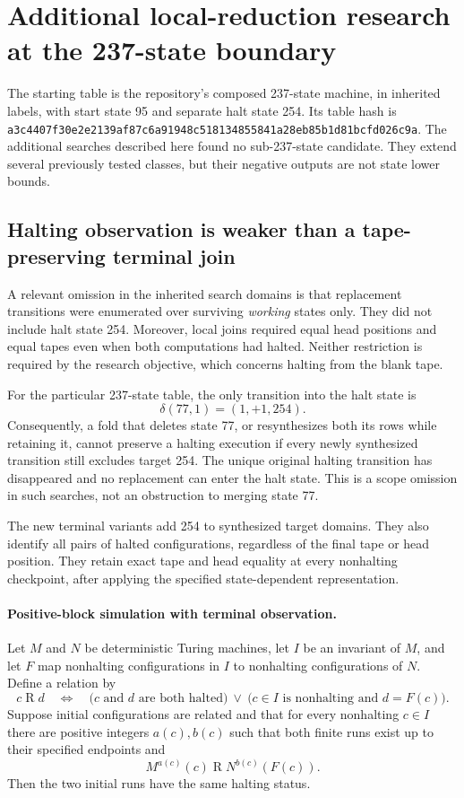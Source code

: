 \section{Additional local-reduction research at the 237-state boundary}

The starting table is the repository's composed 237-state machine, in inherited
labels, with start state 95 and separate halt state 254. Its table hash is
\texttt{a3c4407f30e2e2139af87c6a91948c518134855841a28eb85b1d81bcfd026c9a}.
The additional searches described here found no sub-237-state candidate.
They extend several previously tested classes, but their negative outputs are
not state lower bounds.

\subsection{Halting observation is weaker than a tape-preserving terminal join}

A relevant omission in the inherited search domains is that replacement
transitions were enumerated over surviving \emph{working} states only. They did
not include halt state 254. Moreover, local joins required equal head positions
and equal tapes even when both computations had halted. Neither restriction is
required by the research objective, which concerns halting from the blank tape.

For the particular 237-state table, the only transition into the halt state is
\[
 \delta(77,1)=(1,+1,254).
\]
Consequently, a fold that deletes state 77, or resynthesizes both its rows while
retaining it, cannot preserve a halting execution if every newly synthesized
transition still excludes target 254. The unique original halting transition
has disappeared and no replacement can enter the halt state. This is a scope
omission in such searches, not an obstruction to merging state 77.

The new terminal variants add 254 to synthesized target domains. They also
identify all pairs of halted configurations, regardless of the final tape or
head position. They retain exact tape and head equality at every nonhalting
checkpoint, after applying the specified state-dependent representation.

\paragraph{Positive-block simulation with terminal observation.}
Let $M$ and $N$ be deterministic Turing machines, let $I$ be an invariant of $M$,
and let $F$ map nonhalting configurations in $I$ to nonhalting configurations of
$N$. Define a relation by
\[
 c\mathrel{R}d\quad\Longleftrightarrow\quad
 \bigl(c\text{ and }d\text{ are both halted}\bigr)
 \ \lor\ 
 \bigl(c\in I\text{ is nonhalting and }d=F(c)\bigr).
\]
Suppose initial configurations are related and that for every nonhalting
$c\in I$ there are positive integers $a(c),b(c)$ such that both finite runs
exist up to their specified endpoints and
\[
 M^{a(c)}(c)\mathrel{R}N^{b(c)}(F(c)).
\]
Then the two initial runs have the same halting status.

